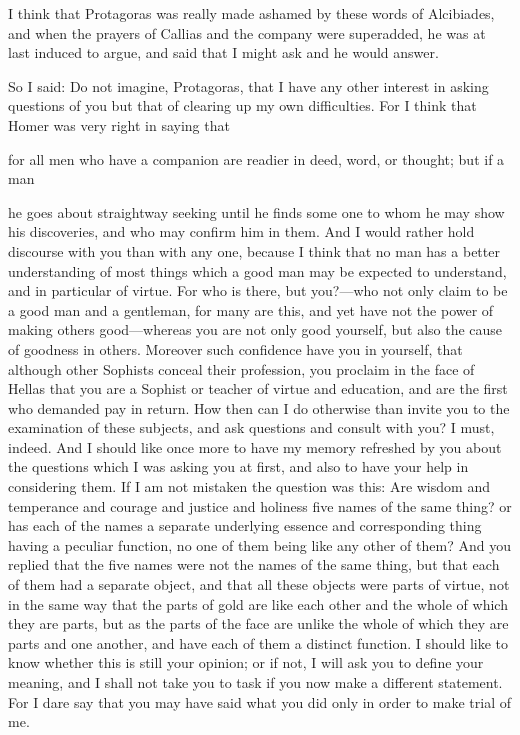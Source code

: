 \documentclass[11pt,letter]{article}
\begin{document}
\par  I think that Protagoras was really made ashamed by these words of Alcibiades, and when the prayers of Callias and the company were superadded, he was at last induced to argue, and said that I might ask and he would answer.

\par  So I said: Do not imagine, Protagoras, that I have any other interest in asking questions of you but that of clearing up my own difficulties. For I think that Homer was very right in saying that
 
\par  for all men who have a companion are readier in deed, word, or thought; but if a man
 
\par  he goes about straightway seeking until he finds some one to whom he may show his discoveries, and who may confirm him in them. And I would rather hold discourse with you than with any one, because I think that no man has a better understanding of most things which a good man may be expected to understand, and in particular of virtue. For who is there, but you?—who not only claim to be a good man and a gentleman, for many are this, and yet have not the power of making others good—whereas you are not only good yourself, but also the cause of goodness in others. Moreover such confidence have you in yourself, that although other Sophists conceal their profession, you proclaim in the face of Hellas that you are a Sophist or teacher of virtue and education, and are the first who demanded pay in return. How then can I do otherwise than invite you to the examination of these subjects, and ask questions and consult with you? I must, indeed. And I should like once more to have my memory refreshed by you about the questions which I was asking you at first, and also to have your help in considering them. If I am not mistaken the question was this: Are wisdom and temperance and courage and justice and holiness five names of the same thing? or has each of the names a separate underlying essence and corresponding thing having a peculiar function, no one of them being like any other of them? And you replied that the five names were not the names of the same thing, but that each of them had a separate object, and that all these objects were parts of virtue, not in the same way that the parts of gold are like each other and the whole of which they are parts, but as the parts of the face are unlike the whole of which they are parts and one another, and have each of them a distinct function. I should like to know whether this is still your opinion; or if not, I will ask you to define your meaning, and I shall not take you to task if you now make a different statement. For I dare say that you may have said what you did only in order to make trial of me.
\end{document}
